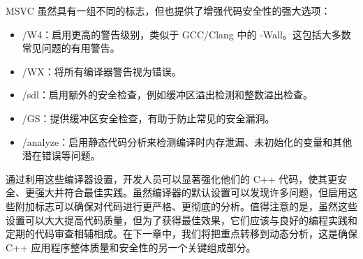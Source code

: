 
MSVC 虽然具有一组不同的标志，但也提供了增强代码安全性的强大选项：

\begin{itemize}
\item
/W4：启用更高的警告级别，类似于 GCC/Clang 中的 -Wall。这包括大多数常见问题的有用警告。

\item
/WX：将所有编译器警告视为错误。

\item
/sdl：启用额外的安全检查，例如缓冲区溢出检测和整数溢出检查。

\item
/GS：提供缓冲区安全检查，有助于防止常见的安全漏洞。

\item
/analyze：启用静态代码分析来检测编译时内存泄漏、未初始化的变量和其他潜在错误等问题。
\end{itemize}

通过利用这些编译器设置，开发人员可以显著强化他们的 C++ 代码，使其更安全、更强大并符合最佳实践。虽然编译器的默认设置可以发现许多问题，但启用这些附加标志可以确保对代码进行更严格、更彻底的分析。值得注意的是，虽然这些设置可以大大提高代码质量，但为了获得最佳效果，它们应该与良好的编程实践和定期的代码审查相辅相成。在下一章中，我们将把重点转移到动态分析，这是确保 C++ 应用程序整体质量和安全性的另一个关键组成部分。








